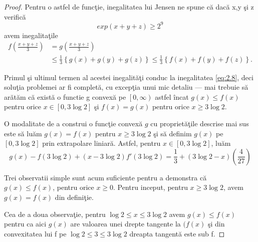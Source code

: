 \documentclass[a4paper,12pt,oneside]{report}
\begin{document}
\begin{proof}
Pentru o astfel de func\c{t}ie, inegalitatea lui Jensen ne spune  c\u{a} dac\u{a} x,y \c{s}i z verific\u{a} \[exp \left ( x + y + z \right )\geq  2^{9} \] avem inegalita\c{t}ile
\begin{displaymath}
\begin{split}
  f\left ( \frac{x + y + z}{3} \right ) &= g\left ( \frac{x + y + z}{3} \right )\\
   &\leq  \frac{1}{3}\left \{ g\left ( x \right ) + g\left ( y \right ) + g\left ( z \right ) \right \} \leq  \frac{1}{3}\left \{ f\left ( x \right ) + f\left ( y \right ) + f\left ( z \right ) \right \}.
  \end{split}
\end{displaymath}

Primul \c{s}i ultimul termen al acestei inegalit\u{a}\c{t}i conduc la inegalitatea \ref{eq:2.8}, deci solu\c{t}ia problemei ar fi complet\u{a}, cu excep\c{t}ia unui mic detaliu — mai trebuie s\u{a} ar\u{a}t\u{a}m c\u{a} exist\u{a} o functie  g convex\u{a} pe \( \left [ 0 , \infty  \right ) \) astfel \^{i}ncat  \(g\left ( x \right ) \leq  f\left ( x \right )\) pentru orice  \(x \in \left [ 0 , 3\log 2 \right ]\) \c{s}i \( f\left ( x \right ) = g\left ( x \right )\) pentru orice \( x \geq 3\log 2\).

O modalitate de a construi o func\c{t}ie convex\u{a} \(g\) cu propriet\u{a}\c{t}ile  descrise mai sus este s\u{a} lu\u{a}m  \(g\left ( x \right ) = f\left ( x \right )\) pentru \(x \geq  3\log2\) \c{s}i s\u{a} definim \(g\left ( x \right )\) pe \(\left [ 0 , 3\log 2 \right ]\) prin extrapolare liniar\u{a}. Astfel, pentru \(x\in \left [ 0 , 3\log 2 \right ]\), lu\u{a}m
\begin{displaymath}
  g\left ( x \right ) - f\left ( 3\log 2 \right ) + \left ( x - 3\log 2 \right ){f}'\left ( 3\log2 \right ) = \frac{1}{3} + \left ( 3\log2 - x  \right )\left ( \frac{4}{27} \right )
\end{displaymath}

Trei observatii simple sunt acum suficiente pentru a demonstra c\u{a} \(g\left ( x \right )\leq f\left ( x \right )\), pentru orice \(x\geq 0\). Pentru inceput, pentru \(x\geq 3\log 2\), avem \(g\left ( x \right ) = f\left ( x \right )\) din defini\c{t}ie.

Cea de a doua observa\c{t}ie, pentru \(\log 2 \leq  x \leq  3\log 2\) avem  \(g( x )\leq f\left ( x \right ) \) pentru ca aici  \(g\left ( x \right )\) are valoarea unei drepte tangente la \((f\left ( x \right )\) \c{s}i din convexitatea lui f pe \(\log 2 \leq  3 \leq 3\log 2\) dreapta tangent\u{a} este sub f.


\end{proof}
\end{document}
